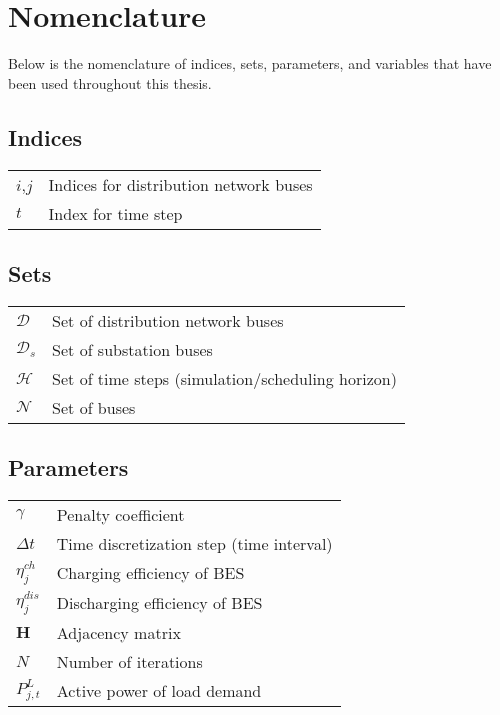 \thispagestyle{plain}			%

\chapter*{Nomenclature}
Below is the nomenclature of indices, sets, parameters, and variables that have been used throughout this thesis.

\section*{Indices}
\renewcommand*{\arraystretch}{1.35}
\begin{longtable}{p{3cm}p{12cm}}
$i$,$j$ & Indices for distribution network buses\\
$t$ & Index for time step\\
\end{longtable}

\section*{Sets}
\renewcommand*{\arraystretch}{1.35}
\begin{longtable}{p{3cm}p{12cm}}
$\mathcal{D}$ & Set of distribution network buses\\
$\mathcal{D}_{s}$ & Set of substation buses \\
$\mathcal{H}$ & Set of time steps (simulation/scheduling horizon)\\
$\mathcal{N}$ & Set of buses\\
\end{longtable}

\section*{Parameters}
\renewcommand*{\arraystretch}{1.35}
\begin{longtable}{p{3cm}p{12cm}}
$\gamma$& Penalty coefficient\\
$\Delta t$& Time discretization step (time interval)\\
$\eta_{j}^{ch}$& Charging efficiency of BES\\
$\eta_{j}^{dis}$& Discharging efficiency of BES\\
$\boldsymbol{H}$& Adjacency matrix\\
$N$ & Number of iterations\\
$P_{j,t}^{L}$& Active power of load demand\\
\end{longtable}

\renewcommand*{\arraystretch}{1}




